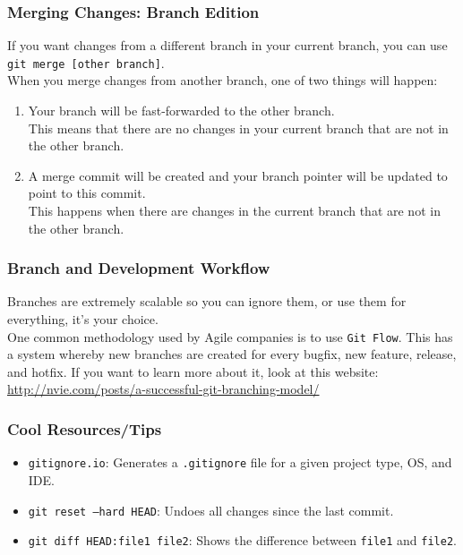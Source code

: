 \documentclass{lug}
\begin{document}
\begin{frame}
    \frametitle{Merging Changes: Branch Edition}
    If you want changes from a different branch in your current branch, you can use \texttt{git
    merge [other branch]}.\\

    When you merge changes from another branch, one of two things will happen\footnotemark:

    \begin{enumerate}
        \item Your branch will be fast-forwarded to the other branch.\\
            This means that there are no changes in your current branch that are not in the other
            branch.
        \item A merge commit will be created and your branch pointer will be updated to point to
            this commit.\\
            This happens when there are changes in the current branch that are not in the other
            branch.
    \end{enumerate}

\end{frame}

\begin{frame}
    \frametitle{Branch and Development Workflow}

    Branches are extremely scalable so you can ignore them, or use them for everything, it's your
    choice.\\

    One common methodology used by Agile companies is to use \texttt{Git Flow}. This has a system
    whereby new branches are created for every bugfix, new feature, release, and hotfix. If you want
    to learn more about it, look at this website:
    \url{http://nvie.com/posts/a-successful-git-branching-model/}
\end{frame}

\begin{frame}
    \frametitle{Cool Resources/Tips}

    \begin{itemize}
        \item \texttt{gitignore.io}: Generates a \texttt{.gitignore} file for a given project type,
            OS, and IDE.
        \item \texttt{git reset --hard HEAD}: Undoes all changes since the last commit.
        \item \texttt{git diff HEAD:file1 file2}: Shows the difference between \texttt{file1} and
            \texttt{file2}.
    \end{itemize}
\end{frame}
\end{document}

